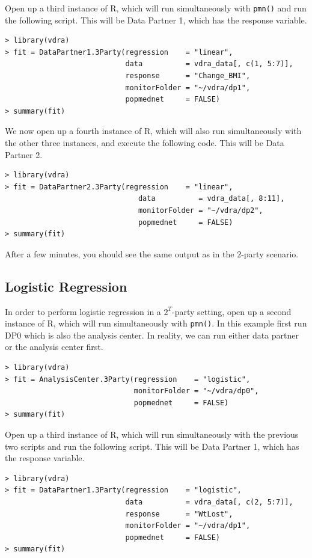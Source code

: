 \documentclass[12]{article}
\begin{document}
Open up a third instance of R, which will run simultaneously with \verb"pmn()" and run the following script.  This will be Data Partner 1, which has the response variable.

\begin{verbatim}
> library(vdra)
> fit = DataPartner1.3Party(regression    = "linear",
                            data          = vdra_data[, c(1, 5:7)],
                            response      = "Change_BMI",
                            monitorFolder = "~/vdra/dp1",
                            popmednet     = FALSE)
> summary(fit)
\end{verbatim}

We now open up a fourth instance of R, which will also run simultaneously with the other three instances, and execute the following code.  This will be Data Partner 2.

\begin{verbatim}
> library(vdra)
> fit = DataPartner2.3Party(regression    = "linear",
                               data          = vdra_data[, 8:11],
                               monitorFolder = "~/vdra/dp2",
                               popmednet     = FALSE)
> summary(fit)
\end{verbatim}

After a few minutes, you should see the same output as in the $2$-party scenario.

\subsection{Logistic Regression}

In order to perform logistic regression in a $2^T$-party setting, open up a second instance of R, which will run simultaneously with \verb"pmn()".  In this example first run DP0 which is also the analysis center.  In reality, we can run either data partner or the analysis center first.

\begin{verbatim}
> library(vdra)
> fit = AnalysisCenter.3Party(regression    = "logistic",
                              monitorFolder = "~/vdra/dp0",
                              popmednet     = FALSE)
> summary(fit)
\end{verbatim}

Open up a third instance of R, which will run simultaneously with the previous two scripts and run the following script.  This will be Data Partner 1, which has the response variable.

\begin{verbatim}
> library(vdra)
> fit = DataPartner1.3Party(regression    = "logistic",
                            data          = vdra_data[, c(2, 5:7)],
                            response      = "WtLost",
                            monitorFolder = "~/vdra/dp1",
                            popmednet     = FALSE)
> summary(fit)
\end{verbatim}
\end{document}
